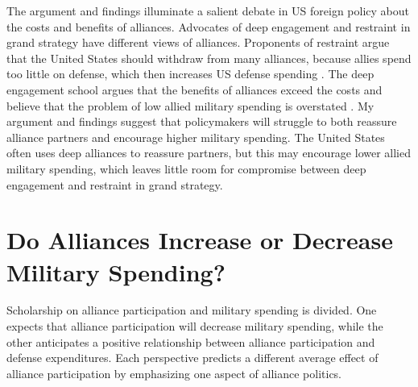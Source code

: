 \documentclass[12pt]{article}
\begin{document}
The argument and findings illuminate a salient debate in US foreign policy about the costs and benefits of alliances. 
Advocates of deep engagement \citep{Brooksetal2013} and restraint \citep{Posen2014} in grand strategy have different views of alliances. 
Proponents of restraint argue that the United States should withdraw from many alliances, because allies spend too little on defense, which then increases US defense spending \citep{Preble2009}.
The deep engagement school argues that the benefits of alliances exceed the costs and believe that the problem of low allied military spending is overstated \citep{BrandsFeaver2017}. 
My argument and findings suggest that policymakers will struggle to both reassure alliance partners and encourage higher military spending. 
The United States often uses deep alliances to reassure partners, but this may encourage lower allied military spending, which leaves little room for compromise between deep engagement and restraint in grand strategy.  





\section{Do Alliances Increase or Decrease Military Spending?}


Scholarship on alliance participation and military spending is divided.
One expects that alliance participation will decrease military spending, while the other anticipates a positive relationship between alliance participation and defense expenditures. 
Each perspective predicts a different average effect of alliance participation by emphasizing one aspect of alliance politics.   
\end{document}
